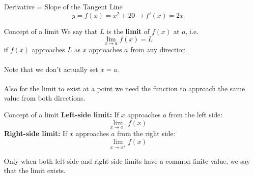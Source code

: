 \documentclass{./../../Latex/teaching_slides}
\begin{document}
\begin{frame}{Derivative = Slope of the Tangent Line}
\vspace{-1.5em}
$$y=f(x)=x^{2}+20 \rightarrow f'(x) = 2x$$ 
\centering
{}
\end{frame}

\begin{frame}{Concept of a limit}
We say that $L$ is the \textbf{limit} of $f(x)$ at $a$, i.e. $$\lim_{x \rightarrow a} f(x) = L$$
if $f(x)$ approaches $L$ as $x$ approaches $a$ from any direction. \\~\\

Note that we don't actually set $x=a$. \\~\\

Also for the limit to exist at a point we need the function to approach the same value from both directions. 
\end{frame}

\begin{frame}{Concept of a limit}
\textbf{Left-side limit:} If $x$ approaches $a$ from the left side:
$$\lim_{x \rightarrow a^-} f(x) $$
 \textbf{Right-side limit:} If $x$ approaches $a$ from the right side:
$$\lim_{x \rightarrow a^+} f(x) $$

Only when both left-side and right-side limits have a common finite value, we say that the limit exists. 
 
\end{frame}
\end{document}
